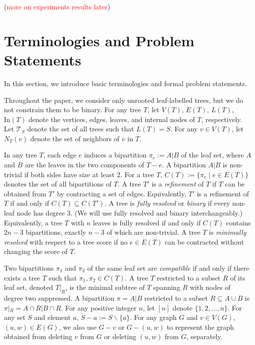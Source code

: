 \documentclass[twocolumn]{bmcart}%
\newcommand{\note}[1]{(\textcolor{red}{#1})}
\newcommand{\In}{\mathrm{In}}
\theoremstyle{mystyle}
\theoremstyle{proofstyle}
\begin{document}
\note{more on experiments results later}



\section{Terminologies and Problem Statements}\label{sec:prelim}
In this section, we introduce basic terminologies and formal problem statements. 

Throughout the paper, we consider only unrooted leaf-labelled trees, but we do not constrain them to be binary. For any tree $T$, let $V(T)$, $E(T)$, $L(T)$, $\In(T)$ denote the vertices, edges, leaves, and internal nodes of $T$, respectively. Let $\mathcal{T}_S$ denote the set of all trees such that $L(T) = S$. For any $v\in V(T)$, let $N_T(v)$ denote the set of neighbors of $v$ in $T$. 

In any tree $T$, each edge $e$ induces a bipartition $\pi_e := A|B$ of the leaf set, where $A$ and $B$ are the leaves in the two components of $T-e$. A bipartition $A|B$ is non-trivial if both sides have size at least $2$. For a tree $T$, $C(T) := \{\pi_e \mid e\in E(T)\}$ denotes the set of all bipartitions of $T$. A tree $T'$ is a \textit{refinement} of $T$ if $T$ can be obtained from $T'$ by contracting a set of edges. Equivalently, $T'$ is a refinement of $T$ if and only if $C(T) \subseteq C(T')$. A tree is \textit{fully resolved} or \textit{binary} if every non-leaf node has degree $3$. (We will use fully resolved and binary interchangeably.) Equivalently, a tree $T$ with $n$ leaves is fully resolved if and only if $C(T)$ contains $2n-3$ bipartitions, exactly $n-3$ of which are non-trivial. A tree $T$ is \textit{minimally resolved} with respect to a tree score if no $e \in E(T)$ can be contracted without changing the score of $T$. 

Two bipartitions $\pi_1$ and $\pi_2$ of the same leaf set are \textit{compatible} if and only if there exists a tree $T$ such that $\pi_1, \pi_2 \in C(T)$. A tree $T$ restricted to a subset $R$ of its leaf set, denoted $T|_R$, is the minimal subtree of $T$ spanning $R$ with nodes of degree two suppressed. A bipartition $\pi = A|B$ restricted to a subset $R \subseteq A\cup B$ is $\pi|_R = A\cap R | B\cap R$. For any positive integer $n$, let $[n]$ denote $\{1,2,\dots,n\}$. For any set $S$ and element $a$, $S-a:= S\backslash \{a\}$. For any graph $G$ and $v \in V(G)$, $(u,w)\in E(G)$, we also use $G - v$ or $G -(u,w)$ to represent the graph obtained from deleting $v$ from $G$ or deleting $(u,w)$ from $G$, separately.
\end{document}
